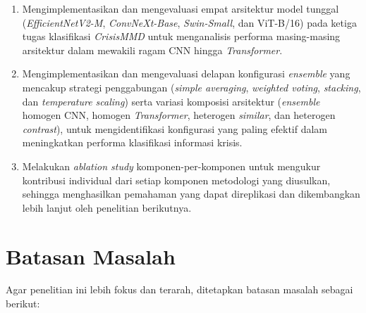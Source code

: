 \begin{enumerate}[noitemsep]
    \item Mengimplementasikan dan mengevaluasi empat arsitektur model
    tunggal (\textit{EfficientNetV2-M}, \textit{ConvNeXt-Base},
    \textit{Swin-Small}, dan ViT-B/16) pada ketiga tugas klasifikasi
    \textit{CrisisMMD} untuk menganalisis performa masing-masing
    arsitektur dalam mewakili ragam CNN hingga \textit{Transformer}.

    \item Mengimplementasikan dan mengevaluasi delapan konfigurasi
    \textit{ensemble} yang mencakup strategi penggabungan (\textit{simple
    averaging}, \textit{weighted voting}, \textit{stacking}, dan
    \textit{temperature scaling}) serta variasi komposisi arsitektur
    (\textit{ensemble} homogen CNN, homogen \textit{Transformer},
    heterogen \textit{similar}, dan heterogen \textit{contrast}), untuk
    mengidentifikasi konfigurasi yang paling efektif dalam meningkatkan
    performa klasifikasi informasi krisis.

    \item Melakukan \textit{ablation study} komponen-per-komponen untuk
    mengukur kontribusi individual dari setiap komponen metodologi yang
    diusulkan, sehingga menghasilkan pemahaman yang dapat direplikasi
    dan dikembangkan lebih lanjut oleh penelitian berikutnya.
\end{enumerate}


\section{Batasan Masalah} \label{I.Batasan}
Agar penelitian ini lebih fokus dan terarah, ditetapkan batasan masalah
sebagai berikut: \par

